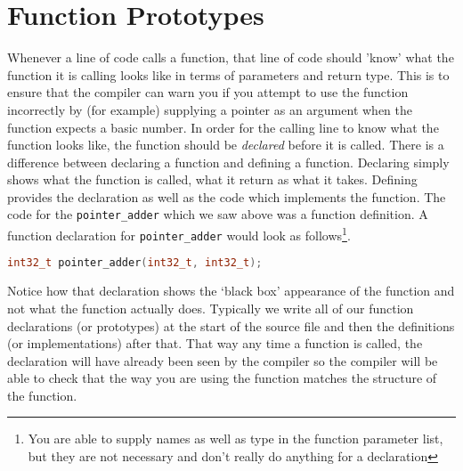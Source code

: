 \section{Function Prototypes}
Whenever a line of code calls a function, that line of code should 'know' what the function it is calling looks like in terms of parameters and return type. 
This is to ensure that the compiler can warn you if you attempt to use the function incorrectly by (for example) supplying a pointer as an argument when the function expects a basic number.
In order for the calling line to know what the function looks like, the function should be \emph{declared} before it is called.
There is a difference between declaring a function and defining a function. 
Declaring simply shows what the function is called, what it return as what it takes.
Defining provides the declaration as well as the code which implements the function. 
The code for the \texttt{pointer\_adder} which we saw above was a function definition. A function declaration for \texttt{pointer\_adder} would look as follows\footnote{You are able to supply names as well as type in the function parameter list, but they are not necessary and don't really do anything for a declaration}.

\begin{lstlisting}[language=c]
int32_t pointer_adder(int32_t, int32_t);
\end{lstlisting}

Notice how that declaration shows the `black box' appearance of the function and not what the function actually does.
Typically we write all of our function declarations (or prototypes) at the start of the source file and then the definitions (or implementations) after that. 
That way any time a function is called, the declaration will have already been seen by the compiler so the compiler will be able to check that the way you are using the function matches the structure of the function.


